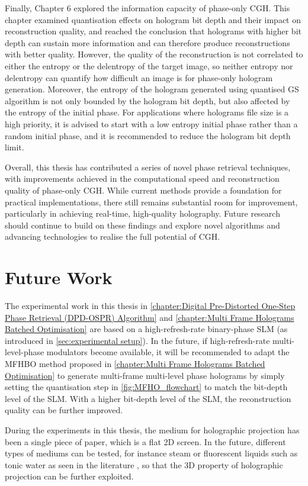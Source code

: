 Finally, Chapter 6 explored the information capacity of phase-only CGH. This chapter examined quantisation effects on hologram bit depth and their impact on reconstruction quality, and reached the conclusion that holograms with higher bit depth can sustain more information and can therefore produce reconstructions with better quality. However, the quality of the reconstruction is not correlated to either the entropy or the delentropy of the target image, so neither entropy nor delentropy can quantify how difficult an image is for phase-only hologram generation. Moreover, the entropy of the hologram generated using quantised GS algorithm is not only bounded by the hologram bit depth, but also affected by the entropy of the initial phase. For applications where holograms file size is a high priority, it is advised to start with a low entropy initial phase rather than a random initial phase, and it is recommended to reduce the hologram bit depth limit.

Overall, this thesis has contributed a series of novel phase retrieval techniques, with improvements achieved in the computational speed and reconstruction quality of phase-only CGH. While current methods provide a foundation for practical implementations, there still remains substantial room for improvement, particularly in achieving real-time, high-quality holography. Future research should continue to build on these findings and explore novel algorithms and advancing technologies to realise the full potential of CGH.

\section{Future Work}
The experimental work in this thesis in \cref{chapter:Digital Pre-Distorted One-Step Phase Retrieval (DPD-OSPR) Algorithm} and \cref{chapter:Multi Frame Holograms Batched Optimisation} are based on a high-refresh-rate binary-phase SLM (as introduced in \cref{sec:experimental setup}). In the future, if high-refresh-rate multi-level-phase modulators become available, it will be recommended to adapt the MFHBO method proposed in \cref{chapter:Multi Frame Holograms Batched Optimisation} to generate multi-frame multi-level phase holograms by simply setting the quantisation step in \cref{fig:MFHO_flowchart} to match the bit-depth level of the SLM. With a higher bit-depth level of the SLM, the reconstruction quality can be further improved.

During the experiments in this thesis, the medium for holographic projection has been a single piece of paper, which is a flat 2D screen. In the future, different types of mediums can be tested, for instance steam or fluorescent liquids such as tonic water as seen in the literature \cite{Makowski2019}, so that the 3D property of holographic projection can be further exploited.

